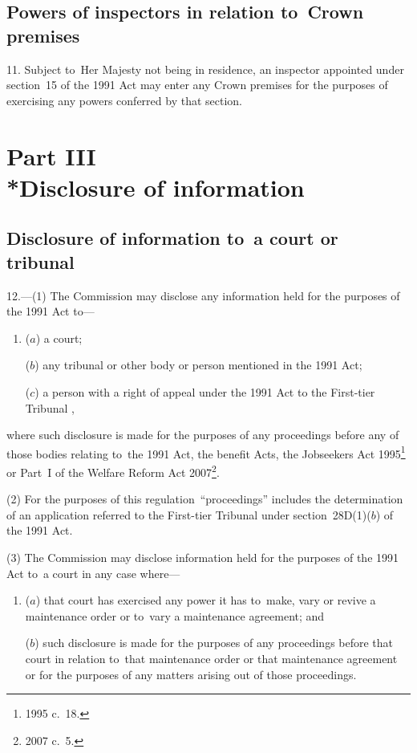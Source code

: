 \documentclass[12pt,a4paper]{article}
\begin{document}
\subsection[11. Powers of inspectors in relation to~Crown premises]{Powers of inspectors in relation to~Crown premises}

11.  Subject to~Her Majesty not being in residence, an inspector appointed under section~15 of the 1991 Act may enter any Crown premises for the purposes of exercising any powers conferred by that section.

\section[Part III --- Disclosure of information]{Part III\\*Disclosure of information}

\renewcommand\parthead{--- Part~III}

\subsection[12. Disclosure of information to~a court or tribunal]{Disclosure of information to~a court or tribunal}

12.---(1)  The Commission may disclose any information held for the purposes of the 1991 Act to—
\begin{enumerate}\item[]
($a$) a court;

($b$) any tribunal or other body or person mentioned in the 1991 Act;

($c$) a person with a right of appeal under the 1991 Act to 
the First-tier Tribunal%
,
\end{enumerate}
where such disclosure is made for the purposes of any proceedings before any of those bodies relating to~the 1991 Act, the benefit Acts, the Jobseekers Act 1995\footnote{1995 c.~18.} or Part~I of the Welfare Reform Act 2007\footnote{2007 c.~5.}.

(2) For the purposes of this regulation~“proceedings” includes the determination of an application referred to 
the First-tier Tribunal  %
under section~28D(1)($b$)  of the 1991 Act.

(3) The Commission may disclose information held for the purposes of the 1991 Act to~a court in any case where—
\begin{enumerate}\item[]
($a$) that court has exercised any power it has to~make, vary or revive a maintenance order or to~vary a maintenance agreement; and

($b$) such disclosure is made for the purposes of any proceedings before that court in relation to~that maintenance order or that maintenance agreement or for the purposes of any matters arising out of those proceedings.
\end{enumerate}
\end{document}
